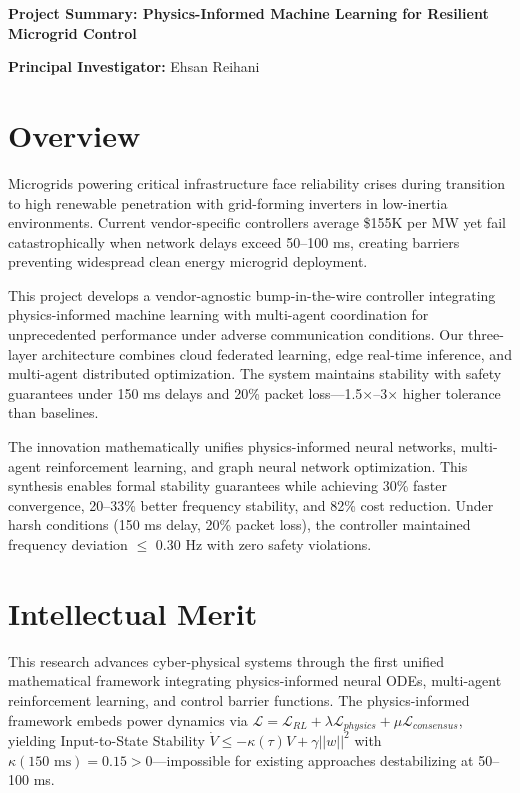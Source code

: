 \documentclass[10pt]{article}
\begin{document}
\textbf{\large Project Summary: Physics-Informed Machine Learning for Resilient Microgrid Control}

\textbf{Principal Investigator:} Ehsan Reihani

\section*{Overview}

Microgrids powering critical infrastructure face reliability crises during transition to high renewable penetration with grid-forming inverters in low-inertia environments. Current vendor-specific controllers average \$155K per MW yet fail catastrophically when network delays exceed 50--100 ms, creating barriers preventing widespread clean energy microgrid deployment.

This project develops a vendor-agnostic bump-in-the-wire controller integrating physics-informed machine learning with multi-agent coordination for unprecedented performance under adverse communication conditions. Our three-layer architecture combines cloud federated learning, edge real-time inference, and multi-agent distributed optimization. The system maintains stability with safety guarantees under 150 ms delays and 20\% packet loss---1.5×--3× higher tolerance than baselines.

The innovation mathematically unifies physics-informed neural networks, multi-agent reinforcement learning, and graph neural network optimization. This synthesis enables formal stability guarantees while achieving 30\% faster convergence, 20–33\% better frequency stability, and 82\% cost reduction. Under harsh conditions (150 ms delay, 20\% packet loss), the controller maintained frequency deviation $\leq$ 0.30 Hz with zero safety violations.

\section*{Intellectual Merit}

This research advances cyber-physical systems through the first unified mathematical framework integrating physics-informed neural ODEs, multi-agent reinforcement learning, and control barrier functions. The physics-informed framework embeds power dynamics via $\mathcal{L} = \mathcal{L}_{RL} + \lambda \mathcal{L}_{physics} + \mu \mathcal{L}_{consensus}$, yielding Input-to-State Stability $\dot{V} \leq -\kappa(\tau)V + \gamma||w||^2$ with $\kappa(150\text{ ms}) = 0.15 > 0$---impossible for existing approaches destabilizing at 50--100 ms.
\end{document}
